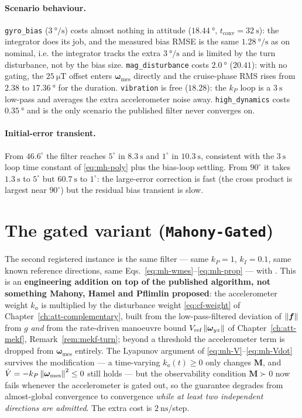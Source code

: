 \paragraph{Scenario behaviour.} \texttt{gyro\_bias} ($\SI{3}{\degree\per\second}$) costs almost
nothing in attitude ($\SI{18.44}{\degree}$, $t_{\text{conv}}=\SI{32}{\second}$): the integrator does
its job, and the measured bias RMSE is the same $\SI{1.28}{\degree\per\second}$ as on nominal, i.e.
the integrator tracks the extra $\SI{3}{\degree\per\second}$ and is limited by the turn disturbance,
not by the bias size. \texttt{mag\_disturbance} costs $\SI{2.0}{\degree}$ ($20.41$): with no gating,
the $\SI{25}{\micro\tesla}$ offset enters $\bm{\omega}_{\text{mes}}$ directly and the cruise-phase
RMS rises from $2.38$ to $\SI{17.36}{\degree}$ for the duration. \texttt{vibration} is free
($18.28$): the $k_P$ loop is a $\SI{3}{\second}$ low-pass and averages the extra accelerometer noise
away. \texttt{high\_dynamics} costs $\SI{0.35}{\degree}$ and is the only scenario the published
filter never converges on.

\paragraph{Initial-error transient.} From $46.6^\circ$ the filter reaches $5^\circ$ in
$\SI{8.3}{\second}$ and $1^\circ$ in $\SI{10.3}{\second}$, consistent with the $\SI{3}{\second}$
loop time constant of \eqref{eq:mh-poly} plus the bias-loop settling. From $90^\circ$ it takes
$\SI{1.3}{\second}$ to $5^\circ$ but $\SI{60.7}{\second}$ to $1^\circ$: the large-error correction
is fast (the cross product is largest near $90^\circ$) but the residual bias transient is slow.

\section{The gated variant (\texttt{Mahony-Gated})}\label{sec:mh-gated}
The second registered instance is the same filter --- same $k_P=1$, $k_I=0.1$, same known reference
directions, same Eqs.~\eqref{eq:mh-wmes}--\eqref{eq:mh-prop} --- with . This is an
\textbf{engineering addition on top of the published algorithm, not something Mahony, Hamel and
Pflimlin proposed}: the accelerometer weight $k_a$ is multiplied by the disturbance weight
\eqref{eq:cf-weight} of Chapter~\ref{ch:att-complementary}, built from the low-pass-filtered
deviation of $\left\lVert \bm{f} \right\rVert$ from $g$ \emph{and} from the rate-driven manoeuvre bound
$V_{\text{ref}}\left\lVert \bm{\omega}_{yz} \right\rVert$ of Chapter~\ref{ch:att-mekf},
Remark~\ref{rem:mekf-turn}; beyond a threshold the accelerometer term is dropped from
$\bm{\omega}_{\text{mes}}$ entirely. The Lyapunov argument of \eqref{eq:mh-V}--\eqref{eq:mh-Vdot}
survives the modification --- a time-varying $k_a(t)\ge0$ only changes $\bm{M}$, and
$\dot V=-k_P\left\lVert \bm{\omega}_{\text{mes}} \right\rVert^2\le0$ still holds --- but the observability condition
$\bm{M}\succ0$ now fails whenever the accelerometer is gated out, so the guarantee degrades from
almost-global convergence to convergence \emph{while at least two independent directions are
admitted}. The extra cost is $\SI{2}{\nano\second}$/step.

